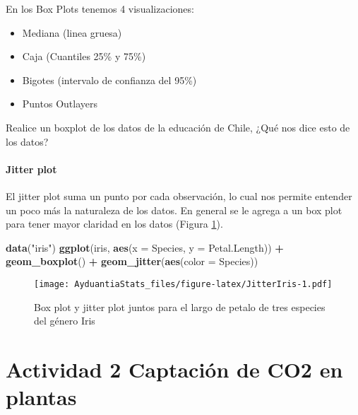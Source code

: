 \documentclass[]{book}
\newenvironment{Shaded}{\begin{snugshade}}{\end{snugshade}}
\newcommand{\DataTypeTok}[1]{\textcolor[rgb]{0.13,0.29,0.53}{#1}}
\newcommand{\KeywordTok}[1]{\textcolor[rgb]{0.13,0.29,0.53}{\textbf{#1}}}
\newcommand{\NormalTok}[1]{#1}
\newcommand{\OperatorTok}[1]{\textcolor[rgb]{0.81,0.36,0.00}{\textbf{#1}}}
\newcommand{\StringTok}[1]{\textcolor[rgb]{0.31,0.60,0.02}{#1}}
\providecommand{\tightlist}{%
  \setlength{\itemsep}{0pt}\setlength{\parskip}{0pt}}
\let\oldparagraph\paragraph
\renewcommand{\paragraph}[1]{\oldparagraph{#1}\mbox{}}
\begin{document}
En los Box Plots tenemos 4 visualizaciones:

\begin{itemize}
\tightlist
\item
  Mediana (linea gruesa)
\item
  Caja (Cuantiles 25\% y 75\%)
\item
  Bigotes (intervalo de confianza del 95\%)
\item
  Puntos Outlayers
\end{itemize}

Realice un boxplot de los datos de la educación de Chile, ¿Qué nos dice esto de los datos?

\hypertarget{jitter-plot}{%
\paragraph{Jitter plot}\label{jitter-plot}}

El jitter plot suma un punto por cada observación, lo cual nos permite entender un poco más la naturaleza de los datos. En general se le agrega a un box plot para tener mayor claridad en los datos (Figura \ref{fig:JitterIris}).

\begin{Shaded}
\begin{Highlighting}[]
\KeywordTok{data}\NormalTok{(}\StringTok{"iris"}\NormalTok{)}
\KeywordTok{ggplot}\NormalTok{(iris, }\KeywordTok{aes}\NormalTok{(}\DataTypeTok{x =}\NormalTok{ Species, }\DataTypeTok{y =}\NormalTok{ Petal.Length)) }\OperatorTok{+}\StringTok{ }\KeywordTok{geom_boxplot}\NormalTok{() }\OperatorTok{+}\StringTok{ }\KeywordTok{geom_jitter}\NormalTok{(}\KeywordTok{aes}\NormalTok{(}\DataTypeTok{color =}\NormalTok{ Species))}
\end{Highlighting}
\end{Shaded}

\begin{figure}
\centering
\texttt{[image: AyduantiaStats\_files/figure-latex/JitterIris-1.pdf]}
\caption{\label{fig:JitterIris}Box plot y jitter plot juntos para el largo de petalo de tres especies del género Iris}
\end{figure}

\hypertarget{actividad-2-captacion-de-co2-en-plantas}{%
\section{Actividad 2 Captación de CO2 en plantas}\label{actividad-2-captacion-de-co2-en-plantas}}
\end{document}
